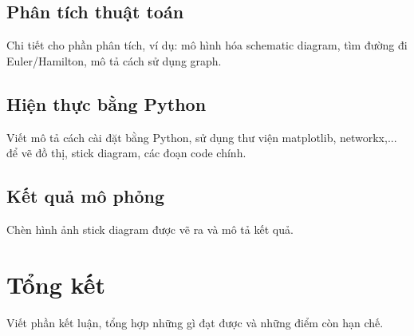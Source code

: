 \documentclass[a4paper,12pt]{article}
\begin{document}
\subsection{Phân tích thuật toán}
Chi tiết cho phần phân tích, ví dụ: mô hình hóa schematic diagram, tìm đường đi Euler/Hamilton, mô tả cách sử dụng graph.

\subsection{Hiện thực bằng Python}
Viết mô tả cách cài đặt bằng Python, sử dụng thư viện matplotlib, networkx,... để vẽ đồ thị, stick diagram, các đoạn code chính.

\subsection{Kết quả mô phỏng}
Chèn hình ảnh stick diagram được vẽ ra và mô tả kết quả.

\section{Tổng kết}
Viết phần kết luận, tổng hợp những gì đạt được và những điểm còn hạn chế.
\end{document}
